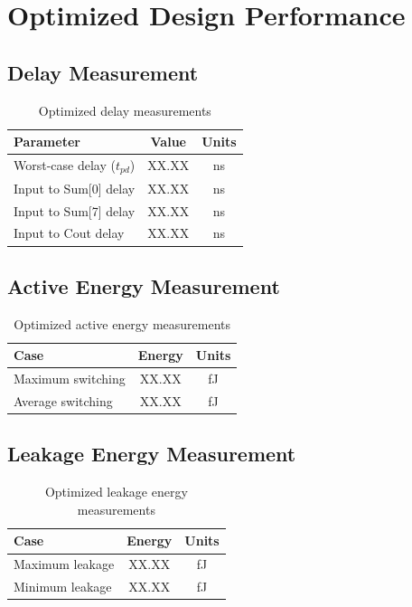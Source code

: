 \documentclass[12pt,letterpaper]{article}
\begin{document}
\section{Optimized Design Performance}
\label{sec:optimized_metrics}


\subsection{Delay Measurement}

\begin{table}[H]
\centering
\caption{Optimized delay measurements}
\label{tab:optimized_delay}
\begin{tabular}{@{}lcc@{}}
\toprule
\textbf{Parameter} & \textbf{Value} & \textbf{Units} \\
\midrule
Worst-case delay ($t_{pd}$) & XX.XX & ns \\
Input to Sum[0] delay & XX.XX & ns \\
Input to Sum[7] delay & XX.XX & ns \\
Input to Cout delay & XX.XX & ns \\
\bottomrule
\end{tabular}
\end{table}

\subsection{Active Energy Measurement}

\begin{table}[H]
\centering
\caption{Optimized active energy measurements}
\label{tab:optimized_active_energy}
\begin{tabular}{@{}lcc@{}}
\toprule
\textbf{Case} & \textbf{Energy} & \textbf{Units} \\
\midrule
Maximum switching & XX.XX & fJ \\
Average switching & XX.XX & fJ \\
\bottomrule
\end{tabular}
\end{table}

\subsection{Leakage Energy Measurement}

\begin{table}[H]
\centering
\caption{Optimized leakage energy measurements}
\label{tab:optimized_leakage}
\begin{tabular}{@{}lcc@{}}
\toprule
\textbf{Case} & \textbf{Energy} & \textbf{Units} \\
\midrule
Maximum leakage & XX.XX & fJ \\
Minimum leakage & XX.XX & fJ \\
\bottomrule
\end{tabular}
\end{table}
\end{document}
